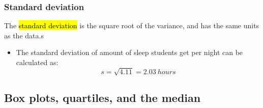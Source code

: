 
\begin{frame}
\frametitle{Standard deviation}

The \hl{standard deviation} is the square root of the variance, and has the same units as the data.s

\formula{
\[ s = \sqrt{s^2} \]
}

\pause

{
\begin{itemize}

\item The standard deviation of amount of sleep students get per night can be calculated as:
\[ s = \sqrt{4.11} = 2.03~hours\]

\end{itemize}
}
{
}

\end{frame}


\subsection{Box plots, quartiles, and the median}


